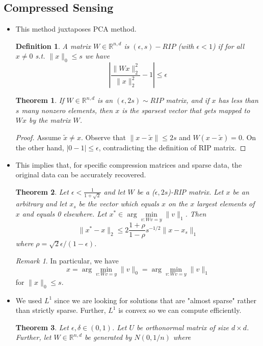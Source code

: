 \documentclass[11pt,reqno]{amsart}
\newtheorem{theorem}{Theorem}
\newtheorem{definition}{Definition}
\theoremstyle{remark}
\newtheorem{remark}[example]{Remark}
\begin{document}
\subsection*{Compressed Sensing}
\begin{itemize}
\item This method juxtaposes PCA method.
\begin{definition}
A matrix $W\in \mathbb{R}^{n,d}$ is $(\epsilon, s)-RIP$ (with $\epsilon<1$) if for all $x\neq 0$ s.t. $\lVert x\rVert_0\leq s$
 we have 
 \[
|\frac{\lVert Wx\rVert^2_2}{\lVert x\rVert^2_2}-1|\leq \epsilon
 \]
\end{definition}
\begin{theorem}
If $W\in\mathbb{R}^{n,d}$ is an $(\epsilon, 2s)\sim RIP$ matrix, 
and if $x$ has less than $s$ many nonzero elements, then $x$ is the sparsest vector that
 gets mapped to $Wx$ by the matrix $W$.
\end{theorem}
\begin{proof}
Assume $\tilde x\neq x$. Observe that 
$\lVert x-\tilde x\rVert\leq 2s$ and $W(x-\tilde x)=0$. 
On the other hand, $\lvert 0-1\rvert\leq \epsilon$, contradicting 
the definition of RIP matrix.
\end{proof}
\item This implies that, for specific compression matrices and sparse data, the original data 
can be accurately recovered.
\begin{theorem}
Let $\epsilon<\frac 1{1+\sqrt{2}}$ and let $W$ be a ($\epsilon, 2s$)-RIP matrix. Let
 $x$ be an arbitrary and let $x_s$ be the vector which equals $x$ on the $x$ largest
  elements of $x$ and equals 0 elsewhere. Let $x^*\in \arg\min\limits_{v:Wv=y}\lVert
    v\rVert_1$. Then
\[
\lVert x^*-x\rVert_2\leq 2\frac{1+\rho}{1-\rho}s^{-1/2}\lVert x-x_s\rVert_1
\]
where $\rho=\sqrt{2}\epsilon/(1-\epsilon)$.
\end{theorem}
\begin{remark}
In particular, we have 
\[
x=\arg\min\limits_{v:Wv=y}\lVert
v\rVert_0=\arg\min\limits_{v:Wv=y}\lVert v\rVert_1
\]
for $\lVert x\rVert_0\leq s$.
\end{remark}
\item We used $L^1$ since we are looking for
solutions that are "almost sparse" rather than strictly sparse. Further, 
$L^1$ is convex so we can compute efficiently.
\begin{theorem}
Let $\epsilon, \delta\in(0,1)$.
Let $U$ be orthonormal matrix of size $d\times d$. Further, 
let $W\in\mathbb{R}^{n,d}$ be generated by $N(0,1/n)$ where 

\end{theorem}
\end{itemize}
\end{document}
